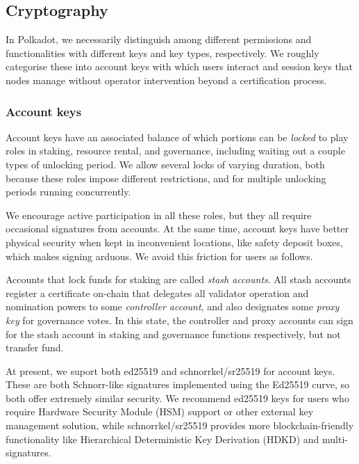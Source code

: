 \subsection{Cryptography}\label{sec:crypto}

In Polkadot, we necessarily distinguish among different permissions and functionalities with different keys and key types, respectively.  We roughly categorise these into account keys with which users interact and session keys that nodes manage without operator intervention beyond a certification process.

\subsubsection{Account keys}

Account keys have an associated balance of which portions can be {\em locked} to play roles in staking, resource rental, and governance, including waiting out a couple types of unlocking period.  We allow several locks of varying duration, both because these roles impose different restrictions, and for multiple unlocking periods running concurrently. 

We encourage active participation in all these roles, but they all require occasional signatures from accounts.  At the same time, account keys have better physical security when kept in inconvenient locations, like safety deposit boxes, which makes signing arduous.  We avoid this friction for users as follows.

Accounts that lock funds for staking are called {\em stash accounts}.  All stash accounts register a certificate on-chain that delegates all validator operation and nomination powers to some {\em controller account}, and also designates some {\em proxy key} for governance votes.  In this state, the controller and proxy accounts can sign for the stash account in staking and governance functions respectively, but not transfer fund.  

\smallskip

At present, we suport both ed25519 \cite{ed25519} and schnorrkel/sr25519 \cite{schnorrkel} for account keys.  These are both Schnorr-like signatures implemented using the Ed25519 curve, so both offer extremely similar security.  We recommend ed25519 keys for users who require Hardware Security Module (HSM) support or other external key management solution, while schnorrkel/sr25519 provides more blockchain-friendly functionality like Hierarchical Deterministic Key Derivation (HDKD) and multi-signatures.  

